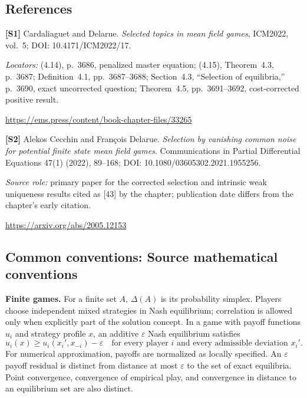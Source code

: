 \documentclass[11pt,a4paper]{article}
\begin{document}
\subsection*{References}
\begingroup\footnotesize\raggedright
{\footnotesize\raggedright
\textbf{[S1]} Cardaliaguet and Delarue. \emph{Selected topics in mean field games}, ICM2022, vol.~5; DOI: 10.4171/ICM2022/17.\par
\textit{Locators:} (4.14), p.~3686, penalized master equation; (4.15), Theorem~4.3, p.~3687; Definition~4.1, pp.~3687--3688; Section~4.3, ``Selection of equilibria,'' p.~3690, exact uncorrected question; Theorem~4.5, pp.~3691--3692, cost-corrected positive result.\par
\url{https://ems.press/content/book-chapter-files/33265}\par\smallskip
\textbf{[S2]} Alekos Cecchin and Fran\c{c}ois Delarue. \emph{Selection by vanishing common noise for potential finite state mean field games}. Communications in Partial Differential Equations 47(1) (2022), 89--168; DOI: 10.1080/03605302.2021.1955256.\par
\textit{Source role:} primary paper for the corrected selection and intrinsic weak uniqueness results cited as [43] by the chapter; publication date differs from the chapter's early citation.\par
\url{https://arxiv.org/abs/2005.12153}\par}
\par\endgroup

\subsection*{Common conventions: Source mathematical conventions}

\textbf{Finite games.} For a finite set $A$, $\Delta(A)$ is its probability
simplex. Players choose independent mixed strategies in Nash equilibrium;
correlation is allowed only when explicitly part of the solution concept.
In a game with payoff functions $u_i$ and strategy profile $x$, an additive
$\varepsilon$ Nash equilibrium satisfies
\[
 u_i(x)\geq u_i(x_i',x_{-i})-\varepsilon
 \quad\text{for every player $i$ and every admissible deviation $x_i'$}.
\]
For numerical approximation, payoffs are normalized as locally specified.
An $\varepsilon$ payoff residual is distinct from distance at most
$\varepsilon$ to the set of exact equilibria. Point convergence, convergence
of empirical play, and convergence in distance to an equilibrium set are
also distinct.
\end{document}
